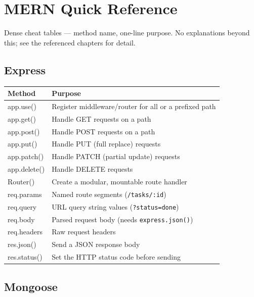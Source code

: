 \chapter{MERN Quick Reference}

\begin{notebox}[NOTE]
Dense cheat tables --- method name, one-line purpose. No explanations
beyond this; see the referenced chapters for detail.
\end{notebox}

\section{Express}

\begin{tabularx}{\textwidth}{@{}>{\ttfamily}p{4cm}X@{}}
\toprule
Method & Purpose \\
\midrule
app.use() & Register middleware/router for all or a prefixed path \\
app.get() & Handle GET requests on a path \\
app.post() & Handle POST requests on a path \\
app.put() & Handle PUT (full replace) requests \\
app.patch() & Handle PATCH (partial update) requests \\
app.delete() & Handle DELETE requests \\
Router() & Create a modular, mountable route handler \\
req.params & Named route segments (\texttt{/tasks/:id}) \\
req.query & URL query string values (\texttt{?status=done}) \\
req.body & Parsed request body (needs \texttt{express.json()}) \\
req.headers & Raw request headers \\
res.json() & Send a JSON response body \\
res.status() & Set the HTTP status code before sending \\
\bottomrule
\end{tabularx}

\section{Mongoose}

